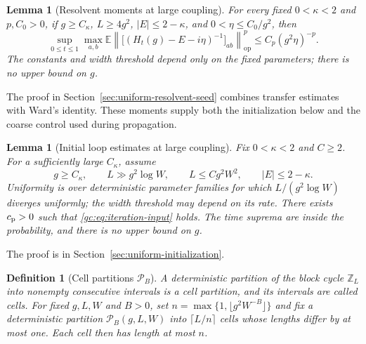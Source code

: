 \documentclass[11pt]{article}
\numberwithin{equation}{section}
\newtheorem{definition}[theorem]{Definition}
\newtheorem{lemma}[theorem]{Lemma}
\theoremstyle{remark}
\newcommand{\E}{\mathbb E}
\newcommand{\Z}{\mathbb Z}
\newcommand{\op}{\mathrm{op}}
\begin{document}
\begin{lemma}[Resolvent moments at large coupling]
\label{fo:lem:resolvent-moments}
For every fixed $0<\kappa<2$ and $p,C_0>0$, if
$g\ge C_\kappa$, $L\ge4g^2$, $|E|\le2-\kappa$, and
$0<\eta\le C_0/g^2$, then
\begin{equation}\label{fo:eq:coarse-resolvent-moments}
 \sup_{0\le t\le1}\max_{a,b}
 \E\left\|\bigl[(H_t(g)-E-i\eta)^{-1}\bigr]_{ab}\right\|_{\op}^p
 \le C_p(g^2\eta)^{-p}.
\end{equation}
The constants and width threshold depend only on the fixed parameters;
there is no upper bound on $g$.
\end{lemma}
The proof in Section~\ref{sec:uniform-resolvent-seed} combines transfer
estimates with Ward's identity. These moments supply both the
initialization below and the coarse control used during propagation.

\begin{lemma}[Initial loop estimates at large coupling]
\label{fo:prop:inputs}\label{uvu:fo:prop:inputs}
Fix $0<\kappa<2$ and $C\ge2$.
For a sufficiently large $C_\kappa$, assume
\[
 g\ge C_\kappa,\qquad L\gg g^2\log W,\qquad
 L\le Cg^2W^2,\qquad |E|\le2-\kappa.
\]
Uniformity is over deterministic parameter families for which
$L/(g^2\log W)$ diverges uniformly; the width threshold may depend on its rate.
There exists $c_{\rm p}>0$ such that
\eqref{gc:eq:iteration-input} holds.
The time suprema are inside the probability, and there is no upper bound on $g$.
\end{lemma}
The proof is in Section~\ref{sec:uniform-initialization}.

\begin{definition}[Cell partitions $\mathcal P_B$]
\label{def:cells-anchors}
A deterministic partition of the block cycle $\Z_L$ into nonempty
consecutive intervals is a \emph{cell partition}, and its intervals are
called \emph{cells}.
For fixed $g,L,W$ and $B>0$, set $n=\max\{1,\lfloor g^2W^{-B}\rfloor\}$
and fix a deterministic partition $\mathcal P_B(g,L,W)$ into
$\lceil L/n\rceil$ cells whose lengths differ by at most one.
Each cell then has length at most $n$.
\end{definition}
\end{document}
